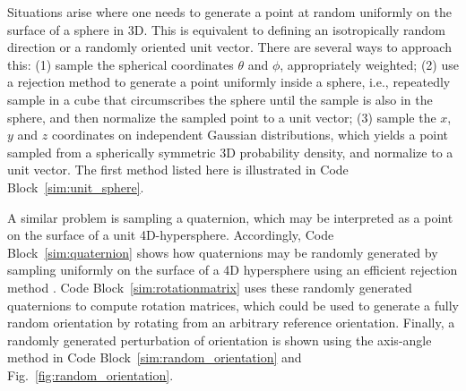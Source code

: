 \documentclass[
  9pt,
  bestpractices,
  pubversion,
]{livecoms}
\begin{document}
Situations arise where one needs to generate a point at random uniformly on the surface of a sphere in 3D.  This is equivalent to defining an isotropically random direction or a randomly oriented unit vector. There are several ways to approach this: (1) sample the spherical coordinates $\theta$ and $\phi$, appropriately weighted; (2) use a rejection method to generate a point uniformly inside a sphere, i.e., repeatedly sample in a cube that circumscribes the sphere until the sample is also in the sphere, and then normalize the sampled point to a unit vector; (3) sample the $x$, $y$ and $z$ coordinates on independent Gaussian distributions, which yields a point sampled from a spherically symmetric 3D probability density, and normalize to a unit vector. The first method listed here is illustrated in Code Block~\ref{sim:unit_sphere}.

A similar problem is sampling a quaternion, which may be interpreted as a point on the surface of a unit 4D-hypersphere.
Accordingly, Code Block~\ref{sim:quaternion} shows how quaternions may be randomly generated by sampling uniformly on the surface of a 4D hypersphere using an efficient rejection method \cite{vesely_angular_1982}.
Code Block~\ref{sim:rotationmatrix} uses these randomly generated quaternions to compute rotation matrices, which could be used to generate a fully random orientation by rotating from an arbitrary reference orientation.
Finally, a randomly generated perturbation of orientation is shown using the axis-angle method in Code Block~\ref{sim:random_orientation} and Fig.~\ref{fig:random_orientation}.

\begin{figure}

\end{figure}
\end{document}
